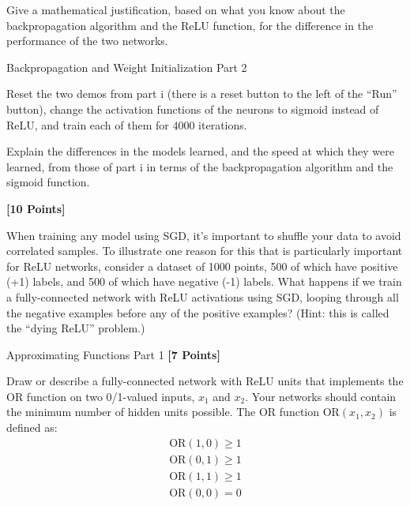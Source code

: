 Give a mathematical justification, based on what you know about the backpropagation algorithm and the ReLU function, for the difference in the performance of the two networks.

\begin{subsolution}

\end{subsolution}

\newpage

\begin{problem}[5]
  Backpropagation and Weight Initialization Part 2
\end{problem}

Reset the two demos from part i (there is a reset button to the left of the ``Run'' button), change the activation functions of the neurons to sigmoid instead of ReLU, and train each of them for 4000 iterations.

Explain the differences in the models learned, and the speed at which they were learned, from those of part i in terms of the backpropagation algorithm and the sigmoid function.

\begin{subsolution}

\end{subsolution}

\newpage


\problem \textbf{[10 Points]}

When training any model using SGD, it's important to shuffle your data to avoid correlated samples. To illustrate one reason for this that is particularly important for ReLU networks, consider a dataset of 1000 points, 500 of which have positive (+1) labels, and 500 of which have negative (-1) labels. What happens if we train a fully-connected network with ReLU activations using SGD, looping through all the negative examples before any of the positive examples? (Hint: this is called the ``dying ReLU'' problem.)


\begin{solution}

\end{solution}

\newpage



\problem Approximating Functions Part 1 \textbf{[7 Points]}

Draw or describe a fully-connected network with ReLU units that implements the OR function on two 0/1-valued inputs,  $x_1$ and $x_2$.  Your networks should contain the minimum number of hidden units possible.  The OR function $\text{OR}(x_1, x_2)$ is defined as:
\begin{gather*}
\text{OR}(1, 0) \geq 1 \\
\text{OR}(0, 1) \geq 1 \\
\text{OR}(1, 1) \geq 1 \\
\text{OR}(0, 0) = 0
\end{gather*}

